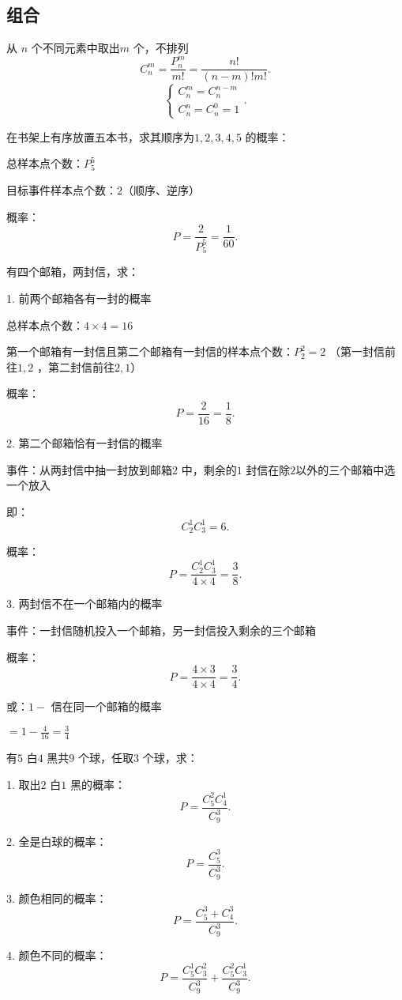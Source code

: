 \subsection{组合}%
\label{sub:组合}
从 $n$ 个不同元素中取出$m$ 个，不排列
\[
    C_n^m=\frac{P_n^m}{m!}=\frac{n!}{\left( n-m \right)! m!}
.\] 
\[
    \begin{cases}
        C_{n}^{m}=C_{n}^{n-m}\\
        C_{n}^{n}=C_{n}^{0}=1
    \end{cases}
.\] 
\begin{eg}
    在书架上有序放置五本书，求其顺序为$1,2,3,4,5$ 的概率：

    总样本点个数：$P_{5}^{5}$

    目标事件样本点个数：$2$（顺序、逆序）

    概率： \[
        P=\frac{2}{P_{5}^{5}}= \frac{1}{60}
    .\] 
\end{eg}
\begin{eg}
    有四个邮箱，两封信，求：

    1. 前两个邮箱各有一封的概率

    总样本点个数：$4\times 4=16$ 

    第一个邮箱有一封信且第二个邮箱有一封信的样本点个数：$P_{2}^{2}=2$ （第一封信前往$1,2$ ，第二封信前往$2,1$）

    概率：\[
        P=\frac{2}{16}=\frac{1}{8}
    .\] 

    2. 第二个邮箱恰有一封信的概率

    事件：从两封信中抽一封放到邮箱$2$ 中，剩余的$1$ 封信在除$2$以外的三个邮箱中选一个放入

    即：\[
        C_{2}^{1}C_{3}^{1}=6
    .\] 

    概率：\[
        P=\frac{C_{2}^{1}C_{3}^{1}}{4\times 4}=\frac{3}{8}
    .\] 

    3. 两封信不在一个邮箱内的概率

    事件：一封信随机投入一个邮箱，另一封信投入剩余的三个邮箱

    概率：
    \[
        P=\frac{4\times 3}{4\times 4}=\frac{3}{4}
    .\] 
    
    或：$1-$ 信在同一个邮箱的概率

    $\displaystyle{=1-\frac{4}{16}=\frac{3}{4}}$
\end{eg}
\begin{eg}
    有$5$ 白$4$ 黑共$9$ 个球，任取$3$ 个球，求：

    1. 取出$2$ 白$1$ 黑的概率：\[
        P=\frac{C_{5}^{2}C_{4}^{1}}{C_{9}^{3}}
    .\] 

    2. 全是白球的概率：\[
        P=\frac{C_{5}^{3}}{C_{9}^{3}}
    .\] 

    3. 颜色相同的概率：\[
        P=\frac{C_{5}^{3}+C_{4}^{3}}{C_{9}^{3}}
    .\] 

    4. 颜色不同的概率：\[
        P=\frac{C_{5}^{1}C_{3}^{2}}{C_{9}^{3}}+\frac{C_{5}^{2}C_{3}^{1}}{C_{9}^{3}}
    .\] 
\end{eg}
